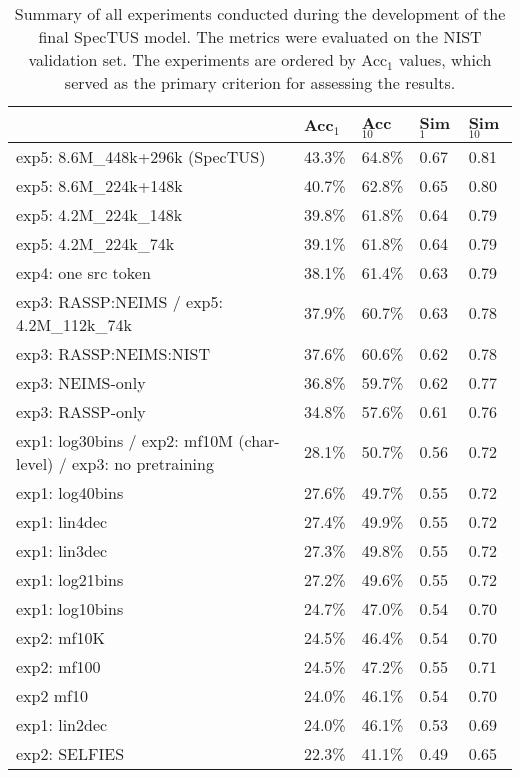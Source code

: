 
% 
\begin{table}[h!]
    \centering
    \begin{tabular}{l|l|l|l|l}
    
          & Acc$_1$ & Acc$_{10}$ & Sim$_1$ & Sim$_{10}$ \\ \hline
        exp5: 8.6M\_448k+296k (SpecTUS) & 43.3\% & 64.8\% & 0.67 & 0.81 \\ \hline
        exp5: 8.6M\_224k+148k & 40.7\% & 62.8\% & 0.65 & 0.80 \\ \hline
        exp5: 4.2M\_224k\_148k & 39.8\% & 61.8\% & 0.64 & 0.79 \\ \hline
        exp5: 4.2M\_224k\_74k & 39.1\% & 61.8\% & 0.64 & 0.79 \\ \hline
        exp4: one src token & 38.1\% & 61.4\% & 0.63 & 0.79 \\ \hline
        exp3: RASSP:NEIMS / exp5: 4.2M\_112k\_74k & 37.9\% & 60.7\% & 0.63 & 0.78 \\ \hline
        exp3: RASSP:NEIMS:NIST & 37.6\% & 60.6\% & 0.62 & 0.78 \\ \hline
        exp3: NEIMS-only & 36.8\% & 59.7\% & 0.62 & 0.77 \\ \hline
        exp3: RASSP-only & 34.8\% & 57.6\% & 0.61 & 0.76 \\ \hline
        exp1: log30bins / exp2: mf10M (char-level) / exp3: no pretraining & 28.1\% & 50.7\% & 0.56 & 0.72 \\ \hline
        exp1: log40bins & 27.6\% & 49.7\% & 0.55 & 0.72 \\ \hline
        exp1: lin4dec & 27.4\% & 49.9\% & 0.55 & 0.72 \\ \hline
        exp1: lin3dec & 27.3\% & 49.8\% & 0.55 & 0.72 \\ \hline
        exp1: log21bins & 27.2\% & 49.6\% & 0.55 & 0.72 \\ \hline
        exp1: log10bins & 24.7\% & 47.0\% & 0.54 & 0.70 \\ \hline
        exp2: mf10K & 24.5\% & 46.4\% & 0.54 & 0.70 \\ \hline
        exp2: mf100 & 24.5\% & 47.2\% & 0.55 & 0.71 \\ \hline
        exp2 mf10 & 24.0\% & 46.1\% & 0.54 & 0.70 \\ \hline
        exp1: lin2dec & 24.0\% & 46.1\% & 0.53 & 0.69 \\ \hline
        exp2: SELFIES & 22.3\% & 41.1\% & 0.49 & 0.65 \\ \hline
    \end{tabular}
    \caption{Summary of all experiments conducted during the development of the final SpecTUS model. The metrics were evaluated on the NIST validation set. The experiments are ordered by Acc$_1$ values, which served as the primary criterion for assessing the results.}
    \label{tab:experiments_comparison}
\end{table}
% 